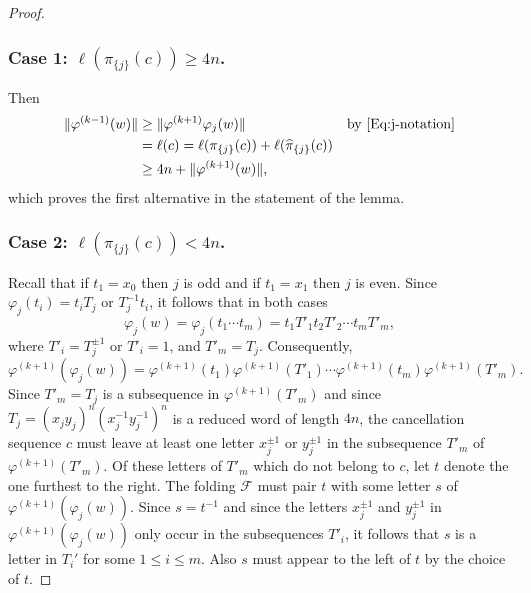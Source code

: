 \documentclass[12pt,reqno,a4paper]{article}
\theoremstyle{definition}
\theoremstyle{remark}
\numberwithin{equation}{section}
\numberwithin{figure}{section}
\newcommand{\C}[1]{{\mathscr #1}}
\begin{document}
\begin{proof}
\subsubsection*{Case 1: $\ell(\pi_{\{j\}}(c))\geq 4n$.}
Then
\begin{align*}
\|\varphi^{(k-1)}(w)\|
&\geq\|\varphi^{(k+1)}\varphi_{j}(w)\| &\text{by \eqref{Eq:j-notation}} \\
&= \ell(c) = \ell(\pi_{\{j\}}(c)) + \ell(\widehat{\pi}_{\{j\}}(c))\\ 
&\geq 4n + \|\varphi^{(k+1)}(w)\|,
\end{align*}
which proves the first alternative in the statement of the lemma.


\subsubsection*{Case 2: {$\ell(\pi_{\{j\}}(c))< 4n$.}}
Recall that if $t_1=x_0$ then $j$ is odd and if $t_1=x_1$ then $j$ is even.
Since $\varphi_j(t_i) = t_iT_j$ or $T_j^{-1}t_i$, it follows that in both cases
$$
\varphi_j(w) = \varphi_j(t_1\cdots t_m) = t_1T'_1t_2T'_2 \cdots t_mT'_m,
$$
where $T'_i = T_j^{\pm 1}$ or $T'_i=1$, and $T'_m=T_j$.
Consequently,
$$
\varphi^{(k+1)}(\varphi_j(w)) = \varphi^{(k+1)}(t_1)\varphi^{(k+1)}(T'_1) \cdots 
\varphi^{(k+1)}(t_m)\varphi^{(k+1)}(T'_m).
$$
Since $T'_m=T_j$ is a subsequence in $\varphi^{(k+1)}(T'_m)$ and since 
$T_j=(x_jy_j)^n(x_j^{-1}y_j^{-1})^n$
is a reduced  word of length $4n$, the cancellation sequence $c$ must leave at least
one letter $x_j^{\pm 1}$ or $y_j^{\pm 1}$ in the subsequence $T'_m$ of $\varphi^{(k+1)}(T'_m)$.
Of these letters of $T'_m$ which do not belong to $c$, let $t$ denote the one
furthest to the right. The folding $\C F$ must pair $t$ with some letter $s$
of $\varphi^{(k+1)}(\varphi_j(w))$. Since $s=t^{-1}$ and since the letters
$x_j^{\pm 1}$ and $y_j^{\pm 1}$ in $\varphi^{(k+1)}(\varphi_j(w))$ only occur
in the subsequences $T'_i$, it follows that $s$ is a letter in $T_i'$ for
some $1\leq i\leq m$. 
Also $s$ must appear to the left of $t$ by the choice of $t$.


\end{proof}
\end{document}
